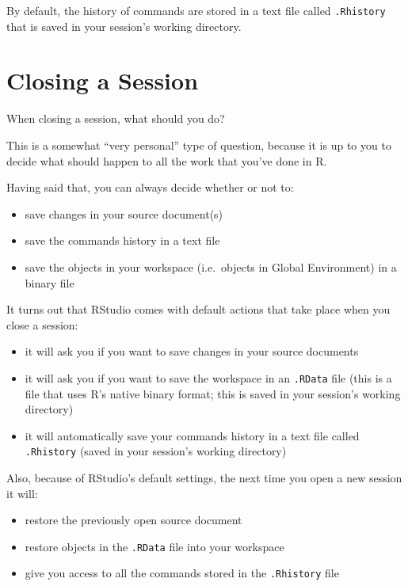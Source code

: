 \documentclass[
]{book}
\begin{document}
By default, the history of commands are stored in a text file called \texttt{.Rhistory}
that is saved in your session's working directory.

\hypertarget{closing-a-session}{%
\section{Closing a Session}\label{closing-a-session}}

When closing a session, what should you do?

This is a somewhat ``very personal'' type of question, because it is up to you to
decide what should happen to all the work that you've done in R.

Having said that, you can always decide whether or not to:

\begin{itemize}
\item
  save changes in your source document(s)
\item
  save the commands history in a text file
\item
  save the objects in your workspace (i.e.~objects in Global Environment) in
  a binary file
\end{itemize}

It turns out that RStudio comes with default actions that take place
when you close a session:

\begin{itemize}
\item
  it will ask you if you want to save changes in your source documents
\item
  it will ask you if you want to save the workspace in an \texttt{.RData} file
  (this is a file that uses R's native binary format; this is saved in your
  session's working directory)
\item
  it will automatically save your commands history in a text file called
  \texttt{.Rhistory} (saved in your session's working directory)
\end{itemize}

Also, because of RStudio's default settings, the next time you open a new
session it will:

\begin{itemize}
\item
  restore the previously open source document
\item
  restore objects in the \texttt{.RData} file into your workspace
\item
  give you access to all the commands stored in the \texttt{.Rhistory} file
\end{itemize}
\end{document}
